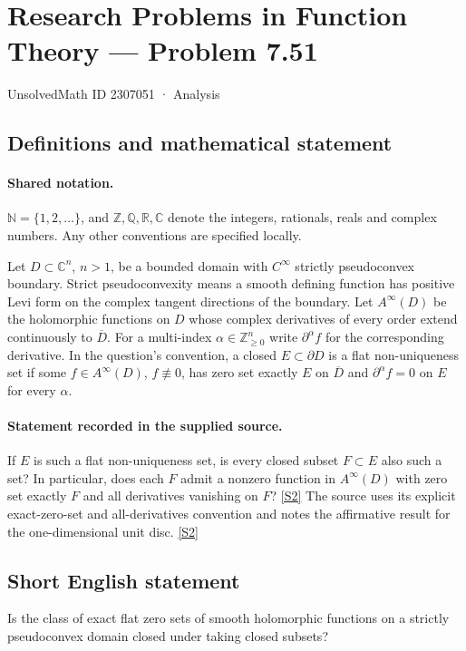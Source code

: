 \documentclass[11pt]{article}
\newcommand{\sref}[2]{\hyperlink{source:#1:#2}{[S#2]}}
\begin{document}
\setcounter{section}{2307050}
\section{Research Problems in Function Theory — Problem 7.51}\label{2307051}
{\small\sffamily UnsolvedMath ID 2307051 · Analysis}
\subsection{Definitions and mathematical statement}

\paragraph{Shared notation.}$\mathbb N=\{1,2,\ldots\}$, and $\mathbb Z,\mathbb Q,\mathbb R,\mathbb C$ denote the integers, rationals, reals and complex numbers. Any other conventions are specified locally.


Let $D\subset\mathbb C^n$, $n>1$, be a bounded domain with $C^\infty$ strictly pseudoconvex boundary. Strict pseudoconvexity means a smooth defining function has positive Levi form on the complex tangent directions of the boundary. Let $A^\infty(D)$ be the holomorphic functions on $D$ whose complex derivatives of every order extend continuously to $\overline D$. For a multi-index $\alpha\in\mathbb Z_{\ge0}^n$ write $\partial^\alpha f$ for the corresponding derivative. In the question's convention, a closed $E\subset\partial D$ is a flat non-uniqueness set if some $f\in A^\infty(D)$, $f\not\equiv0$, has zero set exactly $E$ on $\overline D$ and $\partial^\alpha f=0$ on $E$ for every $\alpha$.

\paragraph{Statement recorded in the supplied source.}
If $E$ is such a flat non-uniqueness set, is every closed subset $F\subset E$ also such a set? In particular, does each $F$ admit a nonzero function in $A^\infty(D)$ with zero set exactly $F$ and all derivatives vanishing on $F$? \sref{2307051}{2}
The source uses its explicit exact-zero-set and all-derivatives convention and notes the affirmative result for the one-dimensional unit disc. \sref{2307051}{2}
\subsection{Short English statement}
Is the class of exact flat zero sets of smooth holomorphic functions on a strictly pseudoconvex domain closed under taking closed subsets?
\end{document}
